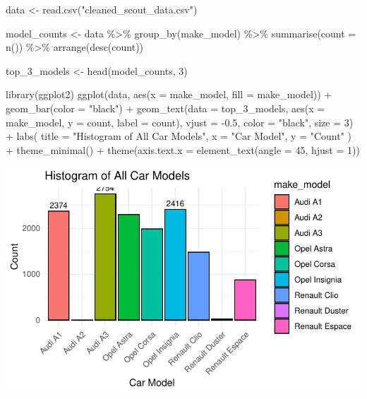 \documentclass[
  letterpaper,
  DIV=11,
  numbers=noendperiod]{scrartcl}
\newenvironment{Shaded}{\begin{snugshade}}{\end{snugshade}}
\newcommand{\AttributeTok}[1]{\textcolor[rgb]{0.40,0.45,0.13}{#1}}
\newcommand{\DecValTok}[1]{\textcolor[rgb]{0.68,0.00,0.00}{#1}}
\newcommand{\FloatTok}[1]{\textcolor[rgb]{0.68,0.00,0.00}{#1}}
\newcommand{\FunctionTok}[1]{\textcolor[rgb]{0.28,0.35,0.67}{#1}}
\newcommand{\NormalTok}[1]{\textcolor[rgb]{0.00,0.23,0.31}{#1}}
\newcommand{\OtherTok}[1]{\textcolor[rgb]{0.00,0.23,0.31}{#1}}
\newcommand{\SpecialCharTok}[1]{\textcolor[rgb]{0.37,0.37,0.37}{#1}}
\newcommand{\StringTok}[1]{\textcolor[rgb]{0.13,0.47,0.30}{#1}}
\begin{document}
\begin{Shaded}
\begin{Highlighting}[]
\NormalTok{data }\OtherTok{\textless{}{-}} \FunctionTok{read.csv}\NormalTok{(}\StringTok{"cleaned\_scout\_data.csv"}\NormalTok{)}

\NormalTok{model\_counts }\OtherTok{\textless{}{-}}\NormalTok{ data }\SpecialCharTok{\%\textgreater{}\%} 
  \FunctionTok{group\_by}\NormalTok{(make\_model) }\SpecialCharTok{\%\textgreater{}\%} 
  \FunctionTok{summarise}\NormalTok{(}\AttributeTok{count =} \FunctionTok{n}\NormalTok{()) }\SpecialCharTok{\%\textgreater{}\%} 
  \FunctionTok{arrange}\NormalTok{(}\FunctionTok{desc}\NormalTok{(count))}

\NormalTok{top\_3\_models }\OtherTok{\textless{}{-}} \FunctionTok{head}\NormalTok{(model\_counts, }\DecValTok{3}\NormalTok{)}

\FunctionTok{library}\NormalTok{(ggplot2)}
\FunctionTok{ggplot}\NormalTok{(data, }\FunctionTok{aes}\NormalTok{(}\AttributeTok{x =}\NormalTok{ make\_model, }\AttributeTok{fill =}\NormalTok{ make\_model)) }\SpecialCharTok{+}
  \FunctionTok{geom\_bar}\NormalTok{(}\AttributeTok{color =} \StringTok{"black"}\NormalTok{) }\SpecialCharTok{+}
  \FunctionTok{geom\_text}\NormalTok{(}\AttributeTok{data =}\NormalTok{ top\_3\_models, }\FunctionTok{aes}\NormalTok{(}\AttributeTok{x =}\NormalTok{ make\_model, }\AttributeTok{y =}\NormalTok{ count, }\AttributeTok{label =}\NormalTok{ count), }
            \AttributeTok{vjust =} \SpecialCharTok{{-}}\FloatTok{0.5}\NormalTok{, }\AttributeTok{color =} \StringTok{"black"}\NormalTok{, }\AttributeTok{size =} \DecValTok{3}\NormalTok{) }\SpecialCharTok{+}
  \FunctionTok{labs}\NormalTok{(}
    \AttributeTok{title =} \StringTok{"Histogram of All Car Models"}\NormalTok{,}
    \AttributeTok{x =} \StringTok{"Car Model"}\NormalTok{,}
    \AttributeTok{y =} \StringTok{"Count"}
\NormalTok{  ) }\SpecialCharTok{+}
  \FunctionTok{theme\_minimal}\NormalTok{() }\SpecialCharTok{+}
  \FunctionTok{theme}\NormalTok{(}\AttributeTok{axis.text.x =} \FunctionTok{element\_text}\NormalTok{(}\AttributeTok{angle =} \DecValTok{45}\NormalTok{, }\AttributeTok{hjust =} \DecValTok{1}\NormalTok{))}
\end{Highlighting}
\end{Shaded}

\includegraphics{Sec4_FP_DavidBadalamenti_HsuanYunLiau_RunyiZhang_files/figure-pdf/unnamed-chunk-1-1.pdf}
\end{document}
